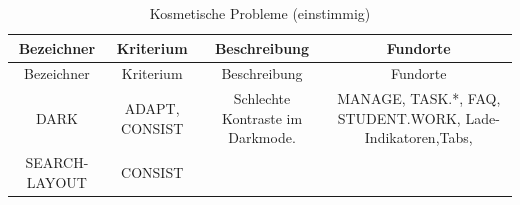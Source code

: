 \documentclass[
  12pt,
  ngerman,
  a4paper,
]{article}
\begin{document}
\begin{longtable}[]{@{}cccc@{}}
\caption{Kosmetische Probleme (einstimmig)
\label{tbl:cosmetical-problems}}\tabularnewline
\toprule
\begin{minipage}[b]{0.11\columnwidth}\centering
Bezeichner\strut
\end{minipage} & \begin{minipage}[b]{0.13\columnwidth}\centering
Kriterium\strut
\end{minipage} & \begin{minipage}[b]{0.33\columnwidth}\centering
Beschreibung\strut
\end{minipage} & \begin{minipage}[b]{0.32\columnwidth}\centering
Fundorte\strut
\end{minipage}\tabularnewline
\midrule
\endfirsthead
\toprule
\begin{minipage}[b]{0.11\columnwidth}\centering
Bezeichner\strut
\end{minipage} & \begin{minipage}[b]{0.13\columnwidth}\centering
Kriterium\strut
\end{minipage} & \begin{minipage}[b]{0.33\columnwidth}\centering
Beschreibung\strut
\end{minipage} & \begin{minipage}[b]{0.32\columnwidth}\centering
Fundorte\strut
\end{minipage}\tabularnewline
\midrule
\endhead
\begin{minipage}[t]{0.11\columnwidth}\centering
DARK\strut
\end{minipage} & \begin{minipage}[t]{0.13\columnwidth}\centering
ADAPT, CONSIST\strut
\end{minipage} & \begin{minipage}[t]{0.33\columnwidth}\centering
Schlechte Kontraste im Darkmode.\strut
\end{minipage} & \begin{minipage}[t]{0.32\columnwidth}\centering
MANAGE, TASK.*, FAQ, STUDENT.WORK, Lade-Indikatoren,Tabs,\strut
\end{minipage}\tabularnewline
\begin{minipage}[t]{0.11\columnwidth}\centering
SEARCH-LAYOUT\strut
\end{minipage} & \begin{minipage}[t]{0.13\columnwidth}\centering
CONSIST\strut
\end{minipage} & \begin{minipage}[t]{0.33\columnwidth}\centering

\end{minipage}
\end{longtable}
\end{document}
